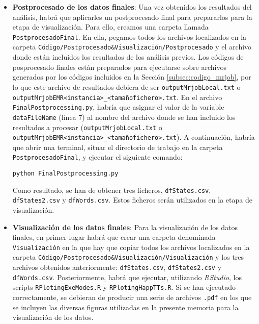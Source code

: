 \documentclass[10pt, spanish]{article}
\begin{document}
\begin{appendices}
\begin{itemize}
\begin{itemize}
\end{itemize}
\item \textbf{Postprocesado de los datos finales}: Una vez obtenidos los resultados del análisis, habrá que aplicarles un postprocesado final para prepararlos para la etapa de visualización. Para ello, creamos una carpeta llamada \texttt{PostprocesadoFinal}. En ella, pegamos todos los archivos localizados en la carpeta \texttt{Código/Postprocesado\&Visualización/Postprocesado} y el archivo donde están incluidos los resultados de los análisis previos. Los códigos de posprocesado finales están preparados para ejecutarse sobre archivos generados por los códigos incluidos en la Sección \ref{subsec:codigo_mrjob}, por lo que este archivo de resultados debiera de ser \texttt{outputMrjobLocal.txt} o \texttt{outputMrjobEMR<instancia>\_<tamañofichero>.txt}. En el archivo \texttt{FinalPostprocessing.py}, habría que asignar el valor de la variable \texttt{dataFileName} (línea 7) al nombre del archivo donde se han incluido los resultados a procesar (\texttt{outputMrjobLocal.txt} o \texttt{outputMrjobEMR<instancia>\_<tamañofichero>.txt}). A continuación, habría que abrir una terminal, situar el directorio de trabajo en la carpeta \texttt{PostprocesadoFinal}, y ejecutar el siguiente comando:

\texttt{python FinalPostprocessing.py}

Como resultado, se han de obtener tres ficheros, \texttt{dfStates.csv}, \texttt{dfStates2.csv} y \texttt{dfWords.csv}. Estos ficheros serán utilizados en la etapa de visualización.


\item \textbf{Visualización de los datos finales}: Para la visualización de los datos finales, en primer lugar habrá que crear una carpeta denominada \texttt{Visualización} en la que hay que copiar todos los archivos localizados en la carpeta \texttt{Código/Postprocesado\&Visualización/Visualización} y los tres archivos obtenidos anteriormente: \texttt{dfStates.csv}, \texttt{dfStates2.csv} y \texttt{dfWords.csv}. Posteriormente, habrá que ejecutar, utilizando \textit{RStudio}, los scripts \texttt{RPlotingExeModes.R} y \texttt{RPlotingHappTTs.R}. Si se han ejecutado correctamente, se debieran de producir una serie de archivos \texttt{.pdf} en los que se incluyen las diversas figuras utilizadas en la presente memoria para la visualización de los datos.
\end{itemize}


\end{appendices}
\end{document}
